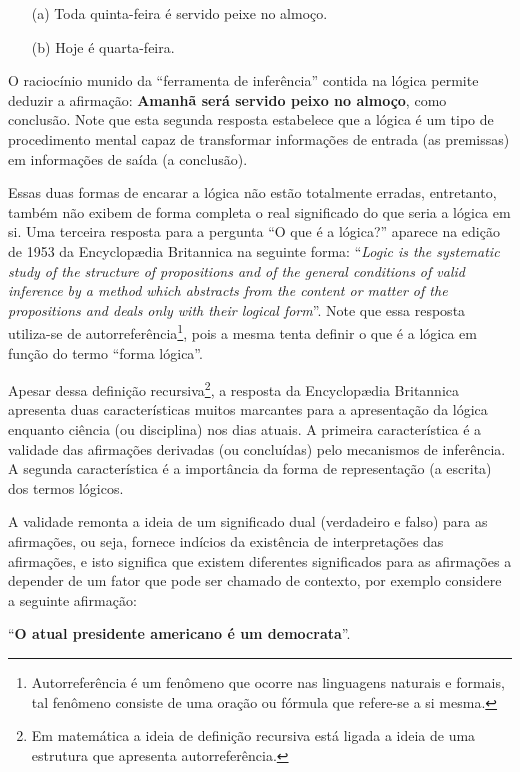 \begin{itemize}
	\item[(a)] Toda quinta-feira é servido peixe no almoço.
	\item[(b)] Hoje é quarta-feira.
\end{itemize}

O raciocínio munido da ``ferramenta de inferência'' contida na lógica permite deduzir a afirmação: \textbf{Amanhã será servido peixo no almoço}, como conclusão. Note que esta segunda resposta estabelece que a lógica é um tipo de procedimento mental capaz de transformar informações de entrada (as premissas) em informações de saída (a conclusão). 

Essas duas formas de encarar a lógica não estão totalmente erradas, entretanto, também não exibem de forma completa o real significado do que seria a lógica em si. Uma terceira resposta para a pergunta ``O que é a lógica?'' aparece na edição de 1953 da Encyclopædia Britannica na seguinte forma: ``\textit{Logic is the systematic study of the structure of propositions and of the general conditions of valid inference by a method which abstracts from the content or matter of the propositions and deals only with their logical form}''. Note que essa resposta utiliza-se de autorreferência\footnote{Autorreferência é um fenômeno que ocorre nas linguagens naturais e formais, tal fenômeno consiste de uma oração ou fórmula que refere-se a si mesma.}, pois a mesma tenta definir o que é a lógica em função do termo ``forma lógica''. 

Apesar dessa definição recursiva\footnote{Em matemática a ideia de definição recursiva está ligada a ideia de uma estrutura que apresenta autorreferência.}, a resposta da Encyclopædia Britannica apresenta duas características muitos marcantes para a apresentação da lógica enquanto ciência (ou disciplina) nos dias atuais. A primeira característica é a validade das afirmações derivadas (ou concluídas) pelo mecanismos de inferência. A segunda característica é a importância da forma de representação (a escrita) dos termos lógicos. 

A validade remonta a ideia de um significado dual (verdadeiro e falso) para as afirmações, ou seja, fornece indícios da existência de interpretações das afirmações, e isto significa que existem diferentes significados para as afirmações a depender de um fator que pode ser chamado de contexto, por exemplo considere a seguinte afirmação: 

\begin{center}
	``\textbf{O atual presidente americano é um democrata}''.
\end{center}

